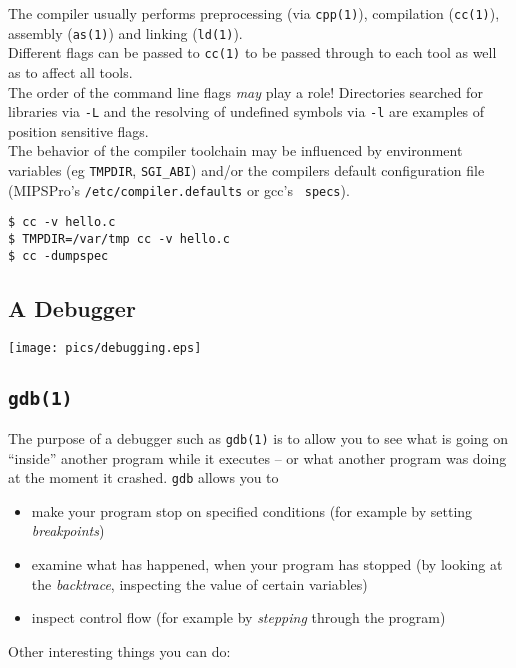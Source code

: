 \documentclass[xga]{xdvislides}
\begin{document}
The compiler usually performs preprocessing (via {\tt cpp(1)}), compilation
({\tt cc(1)}), assembly ({\tt as(1)}) and linking ({\tt ld(1)}).
\\

Different flags can be passed to {\tt cc(1)} to be passed through to each tool
as well as to affect all tools.  \\

The order of the command line flags {\em may} play a role!
Directories searched for libraries via {\tt -L} and the resolving of undefined
symbols via {\tt -l} are examples of position sensitive flags.
\\

The behavior of the compiler toolchain may be influenced by environment
variables (eg {\tt TMPDIR}, {\tt SGI\_ABI}) and/or the compilers default
configuration file (MIPSPro's {\tt /etc/compiler.defaults} or gcc's {\tt
specs}).

\begin{verbatim}
$ cc -v hello.c
$ TMPDIR=/var/tmp cc -v hello.c
$ cc -dumpspec
\end{verbatim}

\subsection{A Debugger}
\vspace*{\fill}
\begin{center}
	\texttt{[image: pics/debugging.eps]}
\end{center}
\vspace*{\fill}

\subsection{{\tt gdb(1)}}

The purpose of a debugger such as {\tt gdb(1)} is to allow you to see what is
going on ``inside'' another program while it executes -- or what another
program was doing at the moment it crashed. {\tt gdb} allows you to

\begin{itemize}
	\item make your program stop on specified conditions (for example by
		setting {\em breakpoints})
	\item examine what has happened, when your program has stopped (by looking
		at the {\em backtrace}, inspecting the value of certain variables)
	\item inspect control flow (for example by {\em stepping} through the
		program)
\end{itemize}
\vspace{.25in}
Other interesting things you can do:
\end{document}
